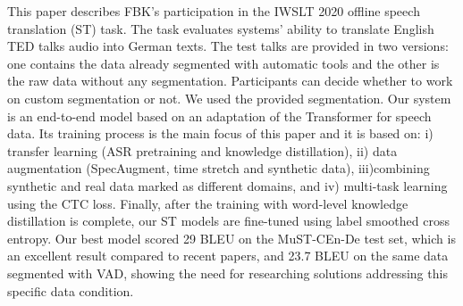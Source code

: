 This paper describes FBK's participation in the IWSLT 2020 offline speech translation (ST) task. The task evaluates systems' ability to translate English TED talks audio into German texts. The test talks are provided in two versions: one contains the data already segmented with automatic tools and the other is the raw data without any segmentation. Participants can decide whether to work on custom segmentation or not. We used the provided segmentation. Our system is an end-to-end model based on an adaptation of the Transformer for speech data. Its training process is the main focus of this paper and it is based on: i) transfer learning (ASR pretraining and knowledge distillation), ii) data augmentation (SpecAugment, time stretch and synthetic data), iii)combining synthetic and real data marked as different domains, and iv) multi-task learning using the CTC loss. Finally, after the training with word-level knowledge distillation is complete, our ST models are fine-tuned using label smoothed cross entropy. Our best model scored 29 BLEU on the MuST-CEn-De test set, which is an excellent result compared to recent papers, and 23.7 BLEU on the same data segmented with VAD, showing the need for researching solutions addressing this specific data condition.
